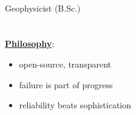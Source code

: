 \documentclass{article}
\begin{document}
\begin{mdframed}[backgroundcolor=anti-flashwhite]
	\begin{minipage}[t]{0.4\textwidth}
	{\fontsize{30pt}{62pt}\color{gray} }\\
    {\fontsize{14pt}{24pt}\color{pblue} \selectfont Geophysicist \color{lightgray} (B.Sc.)}\\\\\\
    \textbf{\underline{Philosophy}}:
    \begin{itemize}
    \item open-source, transparent
    \item failure is part of progress
    \item reliability beats sophistication
    \end{itemize}
	\end{minipage}
	\hfill
	\vrule
	\hfill
	\begin{minipage}[t]{0.2\textwidth}
	\vspace{0cm}
\end{minipage}
\end{mdframed}
\end{document}
